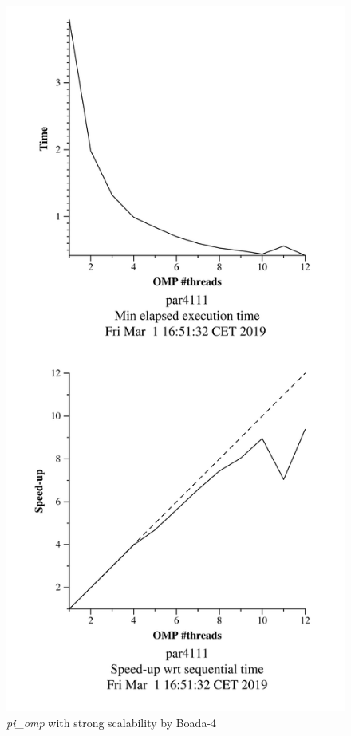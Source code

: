 \documentclass[12]{article}
\begin{document}
\begin{figure}[H]
\centering
\includegraphics[scale=0.15]{images/pi_omp-1000000000-1-12-3-strong-boada-4.png}
 \caption{ \textit{pi\_omp} with strong scalability by Boada-4}
  \label{fig:pi_strong_ompboada4}
\end{figure}
\end{document}
